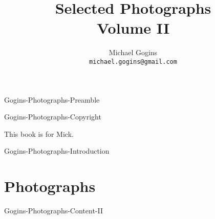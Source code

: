  {Gogins-Photographs-Preamble}

	\frontmatter
	\onecolumn
	
	\title{Selected Photographs \\ Volume II}
	\author{Michael Gogins \\ \texttt{michael.gogins@gmail.com}}
	
	\maketitle
	
	 {Gogins-Photographs-Copyright}
	
	\clearpage
	\begin{centering}
		This book is for Mick.
	\end{centering}
	
	\tableofcontents
	\listoffigures
	
	\mainmatter
	
	\pagestyle{headings}
	\twocolumn
	
	 {Gogins-Photographs-Introduction}	
	
	\chapter{Photographs}
	
	 {Gogins-Photographs-Content-II}
	


